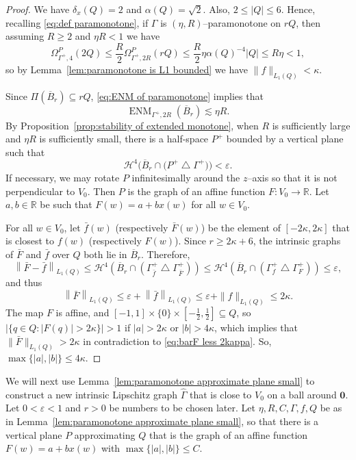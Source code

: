 \documentclass[11pt,reqno]{amsart}
\newcommand{\R}{\mathbb{R}}
\newcommand{\cH}{\mathcal{H}}
\renewcommand{\epsilon}{\varepsilon}
\newcommand{\0}{\mathbf{0}}
\renewcommand{\1}{\mathbf 1}
\newcommand{\from}{\colon}
\newcommand{\symdiff}{\mathbin{\triangle}}
\renewcommand{\mid}{:}
\renewcommand{\subset}{\subseteq}
\renewcommand{\ge}{\geqslant}
\renewcommand{\le}{\leqslant}
\theoremstyle{remark}
\DeclareMathOperator{\ENM}{ENM}
\begin{document}
\begin{proof}
  We have $\delta_x(Q)=2$ and $\alpha(Q)=\sqrt{2}$. Also, $2\le |Q|\le 6$. Hence, recalling \eqref{eq:def paramonotone}, if $\Gamma$ is $(\eta, R)$--paramonotone on $rQ$, then assuming $R\ge 2$ and $\eta R<1$ we have
  $$\Omega^P_{\Gamma^+,4}(2Q)\le \frac{R}{2}\Omega^P_{\Gamma^+,2R}(rQ) \le \frac{R}{2}\eta \alpha(Q)^{-4} |Q| \le R\eta<1,$$
  so by Lemma~\ref{lem:paramonotone is L1 bounded} we have $\|f\|_{L_1(Q)} < \kappa$.

  Since $\Pi(\overline{B}_{r}) \subset r Q$, \eqref{eq:ENM of paramonotone} implies that
  $$\ENM_{\Gamma^+,2R}(\overline{B}_{r})\lesssim \eta R.$$
  By Proposition~\ref{prop:stability of extended monotone}, when $R$ is sufficiently large and $\eta R$ is sufficiently small, there is a half-space $P^+$ bounded by a vertical plane such that
  $$\cH^4\Big(\overline{B}_{r}\cap \big(P^+\symdiff \Gamma^+\big)\Big)<\epsilon.$$
  If necessary, we may rotate $P$ infinitesimally around the $z$--axis so that it is not perpendicular to $V_0$.  Then $P$ is the graph of an affine function $F\from V_0\to \R$.  Let $a,b\in \R$ be such that  $F(w)=a+b x(w)$ for all $w\in V_0$.

  For all $w\in V_0$, let $\bar{f}(w)$ (respectively $\bar{F}(w)$) be the element of $[-2\kappa,2\kappa]$ that is closest to $f(w)$ (respectively $F(w)$).  Since $r \ge 2\kappa+6$, the intrinsic graphs of $\bar{F}$ and $\bar{f}$ over $Q$ both lie in $\overline{B}_{r}$. Therefore,
  $$\left\|\bar{F}-\bar{f}\right\|_{L_1(Q)}\le \cH^4\left(\overline{B}_{r}\cap (\Gamma_{\bar{f}}^+ \symdiff \Gamma_{\bar{F}}^+)\right) \le \cH^4\left(\overline{B}_{r}\cap (\Gamma_{f}^+ \symdiff \Gamma_{F}^+)\right) \le \epsilon,$$
  and thus
  \begin{equation}\label{eq:barF less 2kappa}
    \left\|\bar{F}\right\|_{L_1(Q)}\le \epsilon + \left\|\bar{f}\right\|_{L_1(Q)} \le \epsilon + \|f\|_{L_1(Q)} \le 2\kappa.
  \end{equation}
  The map $F$ is affine, and $[-1,1]\times\{0\}\times  [-\frac{1}{2},\frac{1}{2}]\subset Q$, so $|\{q\in Q\mid |F(q)|>2\kappa \}| > 1$ if $|a|>2\kappa$ or $|b|>4\kappa$,  which implies that $\|\bar{F}\|_{L_1(Q)}>2\kappa$ in contradiction to \eqref{eq:barF less 2kappa}. So, $\max\{|a|,|b|\}\le 4\kappa$.
\end{proof}

We will next use Lemma~\ref{lem:paramonotone approximate plane small} to construct a new intrinsic Lipschitz graph $\hat{\Gamma}$ that is close to $V_0$ on a ball around $\mathbf{0}$.  Let $0<\epsilon<1$ and $r>0$ be numbers to be chosen later. Let $\eta,R,C,\Gamma,f,Q$ be as in Lemma~\ref{lem:paramonotone approximate plane small},  so that there is a vertical plane $P$ approximating $Q$ that is the graph of an affine function $F(w)=a+bx(w)$ with $\max\{|a|,|b|\}\le C$.
\end{document}
